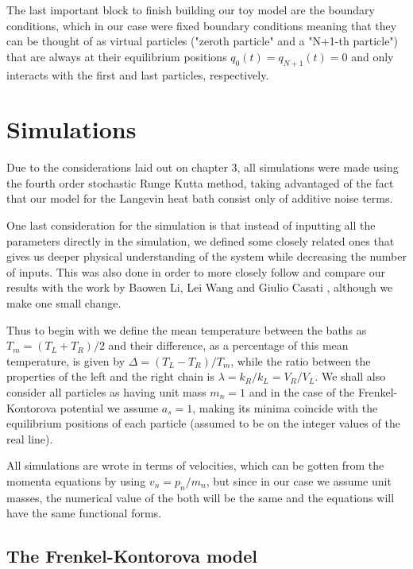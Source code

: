 The last important block to finish building our toy model are the boundary conditions, which in our case were fixed boundary conditions meaning that they can be thought of as virtual particles ("zeroth particle" and a "N+1-th particle") that are always at their equilibrium positions $ q_{0}(t)=q_{N+1}(t)=0 $ and only interacts with the first and last particles, respectively.

\section{Simulations}

Due to the considerations laid out on chapter 3, all simulations were made using the fourth order stochastic Runge Kutta method, taking advantaged of the fact that our model for the Langevin heat bath consist only of additive noise terms.

One last consideration for the simulation is that instead of inputting all the parameters directly in the simulation, we defined some closely related ones that gives us deeper physical understanding of the system while decreasing the number of inputs. This was also done in order to more closely follow and compare our results with the work by Baowen Li, Lei Wang and Giulio Casati \cite{liThermalDiode2004}, although we make one small change.

Thus to begin with we define the mean temperature between the baths as $ T_{m} = (T_{L}+T_{R})/2 $ and their difference, as a percentage of this mean temperature, is given by $ \Delta = (T_{L} - T_{R})/T_{m} $, while the ratio between the properties of the left and the right chain is $ \lambda = k_{R}/k_{L} = V_{R}/V_{L} $. We shall also consider all particles as having unit mass $ m_{n}=1 $ and in the case of the Frenkel-Kontorova potential we assume $ a_{s}=1 $, making its minima coincide with the equilibrium positions of each particle (assumed to be on the integer values of the real line).

All simulations are wrote in terms of velocities, which can be gotten from the momenta equations by using $ v_{n}=p_{n}/m_{n} $, but since in our case we assume unit masses, the numerical value of the both will be the same and the equations will have the same functional forms.

\subsection{The Frenkel-Kontorova model}

